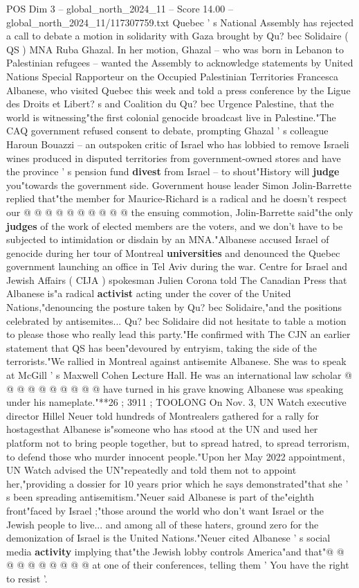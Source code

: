 \begin{textsample}{POS Dim 3 – global\_north\_2024\_11 – Score 14.00 – global\_north\_2024\_11/117307759.txt}  \label{ex:f3_pos_178}
Quebec ' s National Assembly has rejected a call to debate a motion in solidarity with Gaza brought by Qu? bec Solidaire ( QS ) MNA Ruba Ghazal.
In her motion, Ghazal -- who was born in Lebanon to Palestinian refugees -- wanted the Assembly to acknowledge statements by United Nations Special Rapporteur on the Occupied Palestinian Territories Francesca Albanese, who visited Quebec this week and told a press conference by the Ligue des Droits et Libert? s and Coalition du Qu? bec Urgence Palestine, that the world is witnessing"the first colonial genocide broadcast live in Palestine."The CAQ government refused consent to debate, prompting Ghazal ' s colleague Haroun Bouazzi -- an outspoken critic of Israel who has lobbied to remove Israeli wines produced in disputed territories from government-owned stores and have the province ' s pension fund \textbf{divest} from Israel -- to shout"History will \textbf{judge} you"towards the government side.
Government house leader Simon Jolin-Barrette replied that"the member for Maurice-Richard is a radical and he doesn't respect our @ @ @ @ @ @ @ @ @ @ the ensuing commotion, Jolin-Barrette said"the only \textbf{judges} of the work of elected members are the voters, and we don't have to be subjected to intimidation or disdain by an MNA."Albanese accused Israel of genocide during her tour of Montreal \textbf{universities} and denounced the Quebec government launching an office in Tel Aviv during the war.
Centre for Israel and Jewish Affairs ( CIJA ) spokesman Julien Corona told The Canadian Press that Albanese is"a radical \textbf{activist} acting under the cover of the United Nations,"denouncing the posture taken by Qu? bec Solidaire,"and the positions celebrated by antisemites...
Qu? bec Solidaire did not hesitate to table a motion to please those who really lead this party."He confirmed with The CJN an earlier statement that QS has been"devoured by entryism, taking the side of the terrorists."We rallied in Montreal against antisemite Albanese.
She was to speak at McGill ' s Maxwell Cohen Lecture Hall.
He was an international law scholar @ @ @ @ @ @ @ @ @ @ have turned in his grave knowing Albanese was speaking under his nameplate."**26 ; 3911 ; TOOLONG On Nov. 3, UN Watch executive director Hillel Neuer told hundreds of Montrealers gathered for a rally for hostagesthat Albanese is"someone who has stood at the UN and used her platform not to bring people together, but to spread hatred, to spread terrorism, to defend those who murder innocent people."Upon her May 2022 appointment, UN Watch advised the UN"repeatedly and told them not to appoint her,"providing a dossier for 10 years prior which he says demonstrated"that she ' s been spreading antisemitism."Neuer said Albanese is part of the"eighth front"faced by Israel ;"those around the world who don't want Israel or the Jewish people to live... and among all of these haters, ground zero for the demonization of Israel is the United Nations."Neuer cited Albanese ' s social media \textbf{activity} implying that"the Jewish lobby controls America"and that"@ @ @ @ @ @ @ @ @ @ at one of their conferences, telling them ' You have the right to resist '.

\end{textsample}
